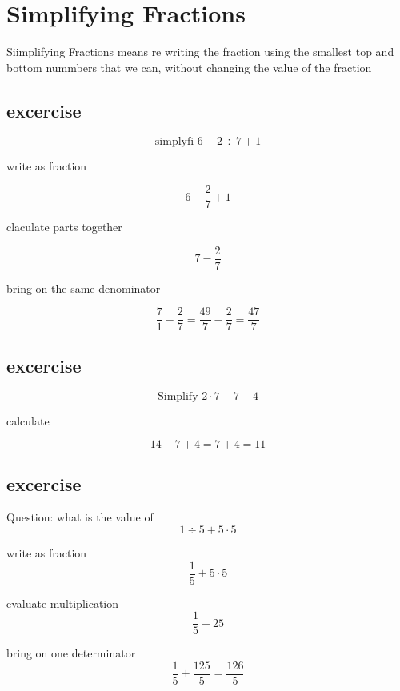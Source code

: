 \documentclass[12pt]{article}
\begin{document}
\section{Simplifying Fractions}


Siimplifying Fractions means re writing the fraction using the 
smallest top and bottom nummbers that we can, without changing the value of 
the fraction 

\subsection{excercise}
$$ \text{simplyfi } 6 - 2 \div 7 + 1 $$

write as fraction

$$ 6- \frac{2}{7} +1 $$

claculate parts together

$$ 7 - \frac{2}{7} $$

bring on the same denominator

$$ \frac{7}{1} - \frac{2}{7} = \frac{49}{7} - \frac{2}{7} = \frac{47}{7} $$

\subsection{excercise}

$$ \text{Simplify } 2 \cdot 7 - 7 + 4 $$

calculate

$$ 14 -7 + 4 = 7+4 = 11 $$

\subsection{excercise}

Question: what is the value of
$$ 1 \div 5 + 5 \cdot 5 $$

write as fraction
$$ \frac{1}{5} + 5 \cdot 5 $$

evaluate multiplication
$$ \frac{1}{5} + 25 $$

bring on one determinator
$$ \frac{1}{5} + \frac{125}{5} = \frac{126}{5}$$
\end{document}
